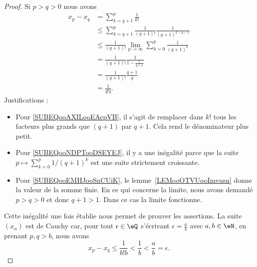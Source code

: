 \begin{proof}
    Si \( p>q>0\) nous avons
    \begin{subequations}
        \begin{align}
            x_p-x_q&=\sum_{k=q+1}^p\frac{1}{ k! }\\
            &\leq \sum_{k=q+1}^p\frac{1}{ (q+1)! }\frac{1}{ (q+1)^{k-q-1} }  \label{SUBEQooAXILooEAcpVB}\\
            &\leq \frac{1}{ (q+1)! }\lim_{p\to \infty} \sum_{k=0}^{p}\frac{1}{ (q+1)^k }  \label{SUBEQooNDPTooDSEYEJ}\\
            &=\frac{1}{ (q+1)! }\frac{1}{ 1-\frac{1}{ q+1 } } \label{SUBEQooEMHJooSnCUiK}  \\
            &=\frac{1}{ (q+1)! }\frac{q+1}{q}\\
            &=\frac{1}{ q!q }.
        \end{align}
    \end{subequations}
    Justifications :
    \begin{itemize}
        \item Pour \eqref{SUBEQooAXILooEAcpVB}, il s'agit de remplacer dans \( k!\) tous les facteurs plus grands que \( (q+1)\) par \( q+1\). Cela rend le dénominateur plus petit.
        \item Pour \eqref{SUBEQooNDPTooDSEYEJ}, il y a une inégalité parce que la suite \( p\mapsto \sum_{k=0}^p1/(q+1)^k\) est une suite strictement croissante.

        \item Pour \eqref{SUBEQooEMHJooSnCUiK}, le lemme~\ref{LEMooOTVUooImvusn} donne la valeur de la somme finie. En ce qui concerne la limite, nous avons demandé \( p>q>0\) et donc \( q+1>1\). Dans ce cas la limite fonctionne.
    \end{itemize}

    Cette inégalité une fois établie nous permet de prouver les assertions. La suite \( (x_n) \) est de Cauchy car, pour tout \( \epsilon\in\eQ\) s'écrivant \( \epsilon=\frac{ a }{ b }\) avec \( a,b\in \eN\), en prenant \( p,q>b\), nous avons
    \begin{equation}
        x_p-x_q\leq \frac{1}{ b!b }<\frac{1}{ b }<\frac{ a }{ b }=\epsilon.
    \end{equation}


\end{proof}
